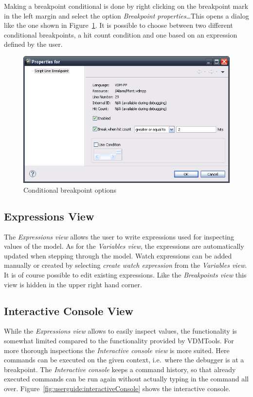 \documentclass{overturerepchap}
\begin{document}
Making a breakpoint conditional is done by right clicking on the breakpoint
mark in the left margin and select the option \emph{Breakpoint properties}\ldots This
opens a dialog like the one shown in
Figure~\ref{fig:userguide:BreakpointConditional}. It is possible to choose
between two different conditional breakpoints, a hit count condition and one
based on an expression defined by the user. 

\begin{figure}[htp]
\begin{center}
  \includegraphics[width=.6\textwidth]{figures/Breakpointconditional}
  \caption{Conditional breakpoint options}
  \label{fig:userguide:BreakpointConditional}
\end{center}
\end{figure}

\subsection{Expressions View}

The \emph{Expressions view} allows the user to write expressions used for inspecting
values of the model. As for the \emph{Variables view}, the expressions are 
automatically updated when stepping through the model.
Watch expressions can be added manually or created by selecting \emph{create watch
expression} from the \emph{Variables view}. It is of course possible to edit existing
expressions. Like the \emph{Breakpoints view} this view is hidden in the upper right
hand corner.

\subsection{Interactive Console View}

While the \emph{Expressions view} allows to easily inspect values, the functionality is
somewhat limited compared to the functionality provided by VDMTools. For more
thorough inspections the \emph{Interactive console view} is more suited. Here commands
can be executed on the given context, i.e.\ where the debugger is at a
breakpoint. The \emph{Interactive console} keeps a command history, so that already
executed commands can be run again without actually typing in the command all
over. Figure~\ref{fig:userguide:interactiveConsole} shows the interactive
console.
\end{document}
